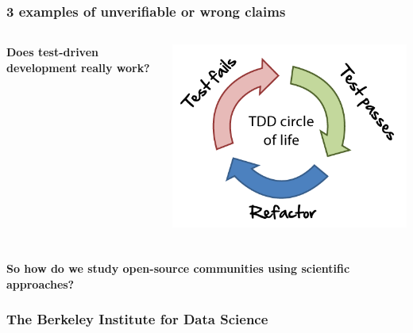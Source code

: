 \documentclass[xcolor=dvipsnames]{beamer}
\begin{document}
\begin{frame}
\frametitle{3 examples of unverifiable or wrong claims}
\begin{columns}
\begin{column}{0.5\linewidth}
{\Large \bf Does test-driven development really work?}
\end{column}
\begin{column}{0.5\linewidth}
\includegraphics[width=0.9\linewidth]{figures/tdd.png}
\end{column}
\end{columns}
\end{frame}

\begin{frame}
\frametitle{}
{\Large \bf So how do we study open-source communities using scientific
approaches?}
\end{frame}

\begin{frame}
\frametitle{The Berkeley Institute for Data Science}
\begin{center}
\end{center}
\end{frame}
\end{document}
